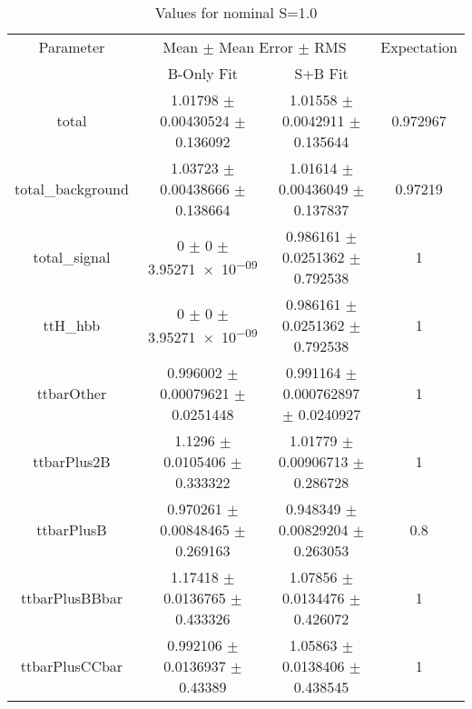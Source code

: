 \begin{table}
\centering
\caption{Values for nominal S=1.0}
\begin{tabular}{cccc}
\toprule
Parameter & \multicolumn{2}{c}{Mean $\pm$ Mean Error $\pm$ RMS} & Expectation\\
 & B-Only Fit & S+B Fit & \\
\midrule
total & \num{1.01798} $\pm$ \num{0.00430524} $\pm$ \num{0.136092} & \num{1.01558} $\pm$ \num{0.0042911} $\pm$ \num{0.135644} & \num{0.972967}\\
total\_background & \num{1.03723} $\pm$ \num{0.00438666} $\pm$ \num{0.138664} & \num{1.01614} $\pm$ \num{0.00436049} $\pm$ \num{0.137837} & \num{0.97219}\\
total\_signal & \num{0} $\pm$ \num{0} $\pm$ \num{3.95271e-09} & \num{0.986161} $\pm$ \num{0.0251362} $\pm$ \num{0.792538} & \num{1}\\
ttH\_hbb & \num{0} $\pm$ \num{0} $\pm$ \num{3.95271e-09} & \num{0.986161} $\pm$ \num{0.0251362} $\pm$ \num{0.792538} & \num{1}\\
ttbarOther & \num{0.996002} $\pm$ \num{0.00079621} $\pm$ \num{0.0251448} & \num{0.991164} $\pm$ \num{0.000762897} $\pm$ \num{0.0240927} & \num{1}\\
ttbarPlus2B & \num{1.1296} $\pm$ \num{0.0105406} $\pm$ \num{0.333322} & \num{1.01779} $\pm$ \num{0.00906713} $\pm$ \num{0.286728} & \num{1}\\
ttbarPlusB & \num{0.970261} $\pm$ \num{0.00848465} $\pm$ \num{0.269163} & \num{0.948349} $\pm$ \num{0.00829204} $\pm$ \num{0.263053} & \num{0.8}\\
ttbarPlusBBbar & \num{1.17418} $\pm$ \num{0.0136765} $\pm$ \num{0.433326} & \num{1.07856} $\pm$ \num{0.0134476} $\pm$ \num{0.426072} & \num{1}\\
ttbarPlusCCbar & \num{0.992106} $\pm$ \num{0.0136937} $\pm$ \num{0.43389} & \num{1.05863} $\pm$ \num{0.0138406} $\pm$ \num{0.438545} & \num{1}\\
\bottomrule
\end{tabular}
\end{table}